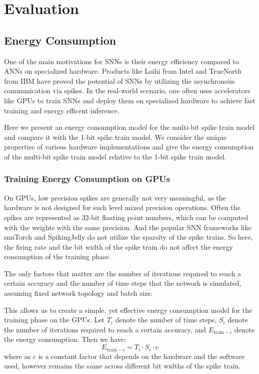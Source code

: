 \chapter{Evaluation}
\label{chap:evaluation}

\section{Energy Consumption}
\label{sec:energy-consumption}
    One of the main motivations for SNNs is their energy efficiency compared to ANNs on specialized hardware. Products like Loihi from Intel and TrueNorth from IBM have proved the potential of SNNs by utilizing the asynchronous communication via spikes. In the real-world scenario, one often uses accelerators like GPUs to train SNNs and deploy them on specialized hardware to achieve fast training and energy efficent inference. 

    Here we present an energy consumption model for the multi-bit spike train model and compare it with the 1-bit spike train model. We consider the unique properties of various hardware implementations and give the energy consumption of the multi-bit spike train model relative to the 1-bit spike train model. 

    \subsection{Training Energy Consumption on GPUs}
    \label{subsec:training_energy}
        On GPUs, low precision spikes are generally not very meaningful, as the hardware is not designed for such level mixed precision operations. Often the spikes are represented as 32-bit floating point numbers, which can be computed with the weights with the same precision. And the popular SNN frameworks like snnTorch and SpikingJelly do not utilize the sparsity of the spike trains. So here, the firing rate and the bit width of the spike train do not affect the energy consumption of the training phase. 
    
        The only factors that matter are the number of iterations required to reach a certain accuracy and the number of time steps that the network is simulated, assuming fixed network topology and batch size. 
    
        This allows us to create a simple, yet effective energy consumption model for the training phase on the GPUs. Let $T_i$ denote the number of time steps, $S_i$ denote the number of iterations required to reach a certain accuracy, and $E_{\text{train}-i}$ denote the energy consumption. Then we have:
        \begin{equation}
            E_{\text{train}-i} = T_i \cdot S_i \cdot c
        \end{equation}
        where as $c$ is a constant factor that depends on the hardware and the software used, however remains the same across different bit widths of the spike train. 
    
